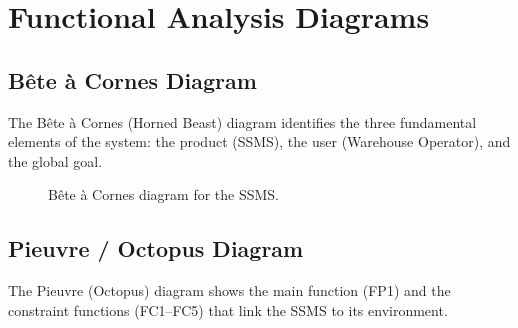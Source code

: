 \section{Functional Analysis Diagrams}
\label{sec:functional-analysis}

\subsection{B\^ete \`a Cornes Diagram}
\label{sec:beteacornes}

The B\^ete \`a Cornes (Horned Beast) diagram identifies the three fundamental elements of the system: the product (SSMS), the user (Warehouse Operator), and the global goal.

\begin{figure}[H]
  \centering
  \caption{B\^ete \`a Cornes diagram for the SSMS.}
  \label{fig:beteacornes}
\end{figure}

\subsection{Pieuvre / Octopus Diagram}
\label{sec:pieuvre}

The Pieuvre (Octopus) diagram shows the main function (FP1) and the constraint functions (FC1--FC5) that link the SSMS to its environment.

